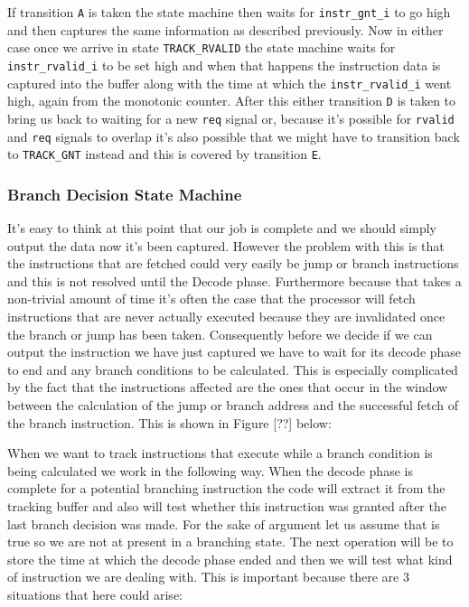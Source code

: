 If transition \texttt{A} is taken the state machine then waits for \texttt{instr\_gnt\_i} to go high and then captures the same information as described previously. Now in either case once we arrive in state \texttt{TRACK\_RVALID} the state machine waits for \texttt{instr\_rvalid\_i} to be set high and when that happens the instruction data is captured into the buffer along with the time at which the \texttt{instr\_rvalid\_i} went high, again from the monotonic counter. After this either transition \texttt{D} is taken to bring us back to waiting for a new \texttt{req} signal or, because it's possible for \texttt{rvalid} and \texttt{req} signals to overlap it's also possible that we might have to transition back to \texttt{TRACK\_GNT} instead and this is covered by transition \texttt{E}. 

\subsubsection{Branch Decision State Machine}

It's easy to think at this point that our job is complete and we should simply output the data now it's been captured. However the problem with this is that the instructions that are fetched could very easily be jump or branch instructions and this is not resolved until the Decode phase. Furthermore because that takes a non-trivial amount of time it's often the case that the processor will fetch instructions that are never actually executed because they are invalidated once the branch or jump has been taken. Consequently before we decide if we can output the instruction we have just captured we have to wait for its decode phase to end and any branch conditions to be calculated. This is especially complicated by the fact that the instructions affected are the ones that occur in the window between the calculation of the jump or branch address and the successful fetch of the branch instruction. This is shown in Figure [??] below:


When we want to track instructions that execute while a branch condition is being calculated we work in the following way. When the decode phase is complete for a potential branching instruction the code will extract it from the tracking buffer and also will test whether this instruction was granted after the last branch decision was made. For the sake of argument let us assume that is true so we are not at present in a branching state. The next operation will be to store the time at which the decode phase ended and then we will test what kind of instruction we are dealing with. This is important because there are 3 situations that here could arise:

